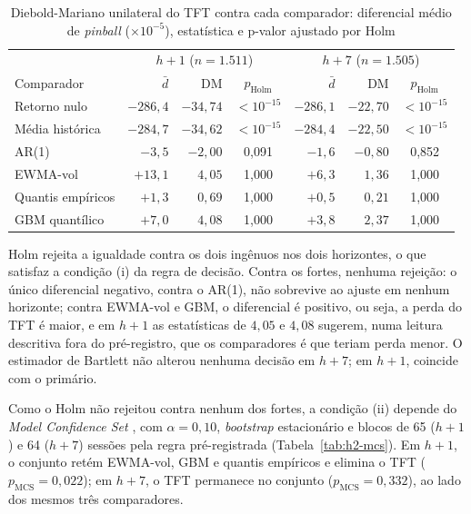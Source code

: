 \begin{table}[htb]
\centering
\caption[Diebold-Mariano unilateral do TFT contra cada comparador]{Diebold-Mariano unilateral do TFT contra cada comparador: diferencial médio de \textit{pinball} (\(\times 10^{-5}\)), estatística e p-valor ajustado por Holm}
\label{tab:h2-dm}
\small
\begin{tabular}{l r r c r r c}
\toprule
 & \multicolumn{3}{c}{\(h+1\) (\(n = 1.511\))} & \multicolumn{3}{c}{\(h+7\) (\(n = 1.505\))} \\
Comparador & \(\bar{d}\) & DM & \(p_{\text{Holm}}\) & \(\bar{d}\) & DM & \(p_{\text{Holm}}\) \\
\midrule
Retorno nulo & \(-286{,}4\) & \(-34{,}74\) & \(<10^{-15}\) & \(-286{,}1\) & \(-22{,}70\) & \(<10^{-15}\) \\
Média histórica & \(-284{,}7\) & \(-34{,}62\) & \(<10^{-15}\) & \(-284{,}4\) & \(-22{,}50\) & \(<10^{-15}\) \\
AR(1) & \(-3{,}5\) & \(-2{,}00\) & 0,091 & \(-1{,}6\) & \(-0{,}80\) & 0,852 \\
EWMA-vol & \(+13{,}1\) & \(4{,}05\) & 1,000 & \(+6{,}3\) & \(1{,}36\) & 1,000 \\
Quantis empíricos & \(+1{,}3\) & \(0{,}69\) & 1,000 & \(+0{,}5\) & \(0{,}21\) & 1,000 \\
GBM quantílico & \(+7{,}0\) & \(4{,}08\) & 1,000 & \(+3{,}8\) & \(2{,}37\) & 1,000 \\
\bottomrule
\end{tabular}
\end{table}

Holm rejeita a igualdade contra os dois ingênuos nos dois horizontes, o que satisfaz a condição (i) da regra de decisão. Contra os fortes, nenhuma rejeição: o único diferencial negativo, contra o AR(1), não sobrevive ao ajuste em nenhum horizonte; contra EWMA-vol e GBM, o diferencial é positivo, ou seja, a perda do TFT é maior, e em \(h+1\) as estatísticas de \(4{,}05\) e \(4{,}08\) sugerem, numa leitura descritiva fora do pré-registro, que os comparadores é que teriam perda menor. O estimador de Bartlett não alterou nenhuma decisão em \(h+7\); em \(h+1\), coincide com o primário.

Como o Holm não rejeitou contra nenhum dos fortes, a condição (ii) depende do \textit{Model Confidence Set} \cite{HANSEN2011MCS}, com \(\alpha = 0{,}10\), \textit{bootstrap} estacionário e blocos de 65 (\(h+1\)) e 64 (\(h+7\)) sessões pela regra pré-registrada (Tabela~\ref{tab:h2-mcs}). Em \(h+1\), o conjunto retém EWMA-vol, GBM e quantis empíricos e elimina o TFT (\(p_{\text{MCS}} = 0{,}022\)); em \(h+7\), o TFT permanece no conjunto (\(p_{\text{MCS}} = 0{,}332\)), ao lado dos mesmos três comparadores.

